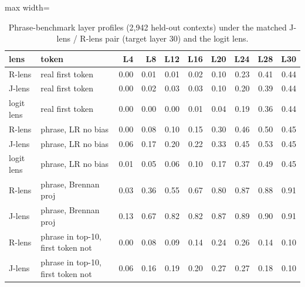\begin{table}[t]
\centering
\footnotesize
\caption{Phrase-benchmark layer profiles (2,942 held-out contexts) under the matched J-lens / R-lens pair (target layer 30) and the logit lens.}
\label{tab:rlens_phrases}
\begin{adjustbox}{max width=\textwidth}
\begin{tabular}{llrrrrrrrr}
\toprule
lens & token & L4 & L8 & L12 & L16 & L20 & L24 & L28 & L30 \\
\midrule
R-lens & real first token & 0.00 & 0.01 & 0.01 & 0.02 & 0.10 & 0.23 & 0.41 & 0.44 \\
J-lens & real first token & 0.00 & 0.02 & 0.03 & 0.03 & 0.10 & 0.20 & 0.39 & 0.44 \\
logit lens & real first token & 0.00 & 0.00 & 0.00 & 0.01 & 0.04 & 0.19 & 0.36 & 0.44 \\
R-lens & phrase, LR no bias & 0.00 & 0.08 & 0.10 & 0.15 & 0.30 & 0.46 & 0.50 & 0.45 \\
J-lens & phrase, LR no bias & 0.06 & 0.17 & 0.20 & 0.22 & 0.33 & 0.45 & 0.53 & 0.45 \\
logit lens & phrase, LR no bias & 0.01 & 0.05 & 0.06 & 0.10 & 0.17 & 0.37 & 0.49 & 0.45 \\
R-lens & phrase, Brennan proj & 0.03 & 0.36 & 0.55 & 0.67 & 0.80 & 0.87 & 0.88 & 0.91 \\
J-lens & phrase, Brennan proj & 0.13 & 0.67 & 0.82 & 0.82 & 0.87 & 0.89 & 0.90 & 0.91 \\
R-lens & phrase in top-10, first token not & 0.00 & 0.08 & 0.09 & 0.14 & 0.24 & 0.26 & 0.14 & 0.10 \\
J-lens & phrase in top-10, first token not & 0.06 & 0.16 & 0.19 & 0.20 & 0.27 & 0.27 & 0.18 & 0.10 \\
\bottomrule
\end{tabular}
\end{adjustbox}
\end{table}